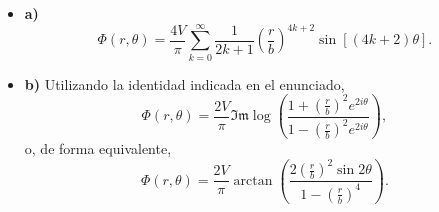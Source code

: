 \documentclass[11pt,spanish]{article}
\renewcommand{\Im}{\mathfrak{Im}}
\begin{document}
\begin{itemize}
\item {\bf a)}
$$
\boxed{
\Phi(r,\theta)
=
\frac{4V}{\pi}
\sum_{k=0}^{\infty}
\frac1{2k+1}
\left(\frac rb\right)^{4k+2}
\sin[(4k+2)\theta].
}
$$
\item {\bf b)} Utilizando la identidad indicada en el enunciado,
$$
\boxed{
\Phi(r,\theta)
=
\frac{2V}{\pi}
\Im
\log
\left(
\frac{1+\left(\frac rb\right)^2e^{2i\theta}}
{1-\left(\frac rb\right)^2e^{2i\theta}}
\right),
}
$$
o, de forma equivalente,
$$
\boxed{
\Phi(r,\theta)
=
\frac{2V}{\pi}
\arctan\left(
\frac{
2\left(\frac rb\right)^2\sin2\theta
}{
1-\left(\frac rb\right)^4
}
\right).
}
$$
\end{itemize}









 
\end{document}
